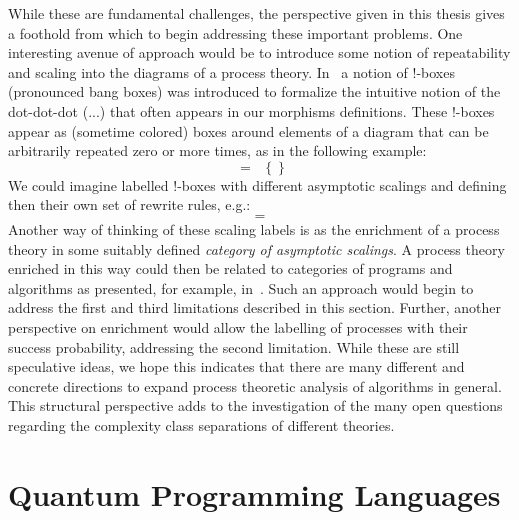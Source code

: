 While these are fundamental challenges, the perspective given in this thesis gives a foothold from which to begin addressing these important problems. One interesting avenue of approach would be to introduce some notion of repeatability and scaling into the diagrams of a process theory. In~\cite{kissinger2012pictures,kissinger2015tensors} a notion of !-boxes (pronounced bang boxes) was introduced to formalize the intuitive notion of the dot-dot-dot ($...$) that often appears in our morphisms definitions. These !-boxes appear as (sometime colored) boxes around elements of a diagram that can be arbitrarily repeated zero or more times, as in the following example:
\begin{equation}

\;=\;\;
\left\{  \right\}
\end{equation}
We could imagine labelled !-boxes with different asymptotic scalings and defining then their own set of rewrite rules, e.g.:
\begin{equation}

\;=\;

\end{equation}
Another way of thinking of these scaling labels is as the enrichment of a process theory in some suitably defined \emph{category of asymptotic scalings}. A process theory enriched in this way could then be related to categories of programs and algorithms as presented, for example, in~\cite{yanofsky2010towards}. Such an approach would begin to address the first and third limitations described in this section. Further, another perspective on enrichment would allow the labelling of processes with their success probability, addressing the second limitation. While these are still speculative ideas, we hope this indicates that there are many different and concrete directions to expand process theoretic analysis of algorithms in general. This structural perspective adds to the investigation of the many open questions regarding the complexity class separations of different theories.

\section{Quantum Programming Languages}

